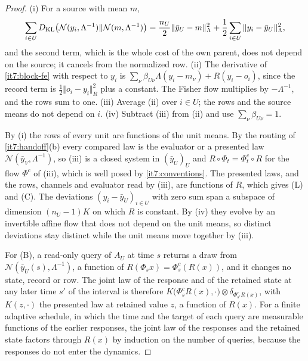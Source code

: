 \documentclass[11pt,letterpaper]{report}
\begin{document}
\begin{proof}
(i) For a source with mean $m$,
\begin{equation}
\sum_{i\in U}D_{\mathrm{KL}}\bigl(\mathcal N(y_i,\Lambda^{-1})\Vert\mathcal N(m,\Lambda^{-1})\bigr)=\frac{n_U}2\Vert\bar y_U-m\Vert_\Lambda^2+\frac12\sum_{i\in U}\Vert y_i-\bar y_U\Vert_\Lambda^2,
\end{equation}
and the second term, which is the whole cost of the own parent, does not depend on the source; it cancels from the normalized row. (ii) The derivative of \cref{it7:block-fe} with respect to $y_i$ is $\sum_\nu\beta_{U\nu}\Lambda(y_i-m_\nu)+R(y_i-o_i)$, since the record term is $\frac12\Vert o_i-y_i\Vert_R^2$ plus a constant. The Fisher flow multiplies by $-\Lambda^{-1}$, and the rows sum to one. (iii) Average (ii) over $i\in U$; the rows and the source means do not depend on $i$. (iv) Subtract (iii) from (ii) and use $\sum_\nu\beta_{U\nu}=1$.

By (i) the rows of every unit are functions of the unit means. By the routing of \cref{it7:handoff}(b) every compared law is the evaluator or a presented law $\mathcal N(\bar y_V,\Lambda^{-1})$, so (iii) is a closed system in $(\bar y_U)_U$ and $R\circ\Phi_t=\Phi^c_t\circ R$ for the flow $\Phi^c$ of (iii), which is well posed by \cref{it7:conventions}. The presented laws, and the rows, channels and evaluator read by (iii), are functions of $R$, which gives (L) and (C). The deviations $(y_i-\bar y_U)_{i\in U}$ with zero sum span a subspace of dimension $(n_U-1)K$ on which $R$ is constant. By (iv) they evolve by an invertible affine flow that does not depend on the unit means, so distinct deviations stay distinct while the unit means move together by (iii).

For (B), a read-only query of $A_U$ at time $s$ returns a draw from $\mathcal N(\bar y_U(s),\Lambda^{-1})$, a function of $R(\Phi_sx)=\Phi^c_s(R(x))$, and it changes no state, record or row. The joint law of the response and of the retained state at any later time $s'$ of the interval is therefore $K\bigl(\Phi^c_sR(x),\cdot\bigr)\otimes\delta_{\Phi^c_{s'}R(x)}$, with $K(z,\cdot)$ the presented law at retained value $z$, a function of $R(x)$. For a finite adaptive schedule, in which the time and the target of each query are measurable functions of the earlier responses, the joint law of the responses and the retained state factors through $R(x)$ by induction on the number of queries, because the responses do not enter the dynamics.
\end{proof}
\end{document}
